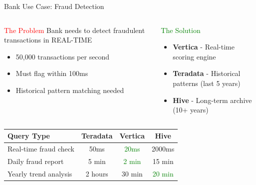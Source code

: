 \documentclass{beamer}
\begin{document}
	
	\begin{frame}{Bank Use Case: Fraud Detection}
		\begin{columns}[T]
			\begin{block}{\textcolor{red}{The Problem}}
				\small
				Bank needs to detect fraudulent transactions in REAL-TIME
				\begin{itemize}
					\item 50,000 transactions per second
					\item Must flag within 100ms
					\item Historical pattern matching needed
				\end{itemize}
			\end{block}
			
			\begin{block}{\textcolor{green}{The Solution}}
				\begin{itemize}
					\item \textbf{Vertica} - Real-time scoring engine
					\item \textbf{Teradata} - Historical patterns (last 5 years)
					\item \textbf{Hive} - Long-term archive (10+ years)
				\end{itemize}
			\end{block}
		\end{columns}
		
		\begin{table}
			\small
			\begin{tabular}{|l|c|c|c|}
				\hline
				\textbf{Query Type} & \textbf{Teradata} & \textbf{Vertica} & \textbf{Hive} \\
				\hline
				Real-time fraud check & 50ms & \textcolor{green}{20ms} & 2000ms \\
				\hline
				Daily fraud report & 5 min & \textcolor{green}{2 min} & 15 min \\
				\hline
				Yearly trend analysis & 2 hours & 30 min & \textcolor{green}{20 min} \\
				\hline
			\end{tabular}
		\end{table}
	\end{frame}
	
\end{document}
